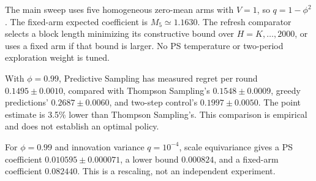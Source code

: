 The main sweep uses five homogeneous zero-mean arms with $V=1$, so $q=1-\phi^2$. The fixed-arm expected coefficient is $M_5\simeq1.1630$. The refresh comparator selects a block length minimizing its constructive bound over $H=K,\ldots,2000$, or uses a fixed arm if that bound is larger. No PS temperature or two-period exploration weight is tuned.

\begin{table}[ht]
\centering
\caption{Measured regret per round against the full-current-state oracle. The lower bound is exact; remaining entries are empirical means and 95\% interval halfwidths.}
\end{table}


With $\phi=0.99$, Predictive Sampling has measured regret per round $0.1495\pm0.0010$, compared with Thompson Sampling's $0.1548\pm0.0009$, greedy predictions' $0.2687\pm0.0060$, and two-step control's $0.1997\pm0.0050$. The point estimate is 3.5\% lower than Thompson Sampling's. This comparison is empirical and does not establish an optimal policy.

For $\phi=0.99$ and innovation variance $q=10^{-4}$, scale equivariance gives a PS coefficient $0.010595\pm0.000071$, a lower bound $0.000824$, and a fixed-arm coefficient $0.082440$. This is a rescaling, not an independent experiment.

